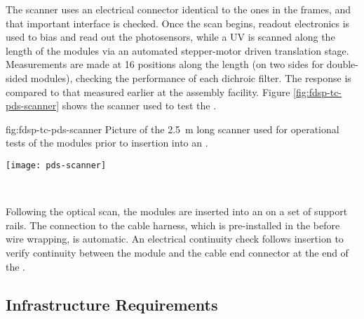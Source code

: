 The scanner  uses an electrical connector identical to the ones in the  frames, and that important interface is checked. Once the scan begins,   readout electronics is used to bias and read out the photosensors, while a UV  is scanned along the length of the modules via an automated stepper-motor driven translation stage.  Measurements are made at 16 positions along the length (on two sides for double-sided  modules), checking the performance of each  dichroic filter. The response is compared to that measured earlier at the assembly facility. Figure \ref{fig:fdsp-tc-pds-scanner} shows the scanner used to test the  .

\begin{dunefigure}{fig:fdsp-tc-pds-scanner}
{Picture of the \SI{2.5}{m} long scanner used for operational tests of the   modules prior to insertion into an .} 

\texttt{[image: pds-scanner]}
\end{dunefigure}
\


Following the optical scan, the  modules are inserted into an   on a set of   support rails. The connection to the cable harness, which is pre-installed in the  before wire wrapping, is automatic. An electrical continuity check follows insertion to verify  continuity between the  module and the  cable end connector at the end of the .

\subsection{Infrastructure Requirements}%

